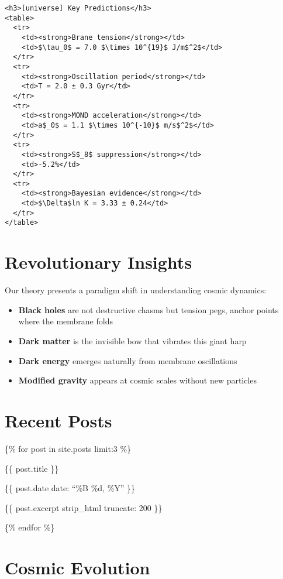 \documentclass[
  11pt,
]{report}
\providecommand{\tightlist}{%
  \setlength{\itemsep}{0pt}\setlength{\parskip}{0pt}}
\begin{document}
\begin{verbatim}
<h3>[universe] Key Predictions</h3>
<table>
  <tr>
    <td><strong>Brane tension</strong></td>
    <td>$\tau_0$ = 7.0 $\times 10^{19}$ J/m$^2$</td>
  </tr>
  <tr>
    <td><strong>Oscillation period</strong></td>
    <td>T = 2.0 ± 0.3 Gyr</td>
  </tr>
  <tr>
    <td><strong>MOND acceleration</strong></td>
    <td>a$_0$ = 1.1 $\times 10^{-10}$ m/s$^2$</td>
  </tr>
  <tr>
    <td><strong>S$_8$ suppression</strong></td>
    <td>-5.2%</td>
  </tr>
  <tr>
    <td><strong>Bayesian evidence</strong></td>
    <td>$\Delta$ln K = 3.33 ± 0.24</td>
  </tr>
</table>
\end{verbatim}

\section{Revolutionary Insights}\label{revolutionary-insights}

Our theory presents a paradigm shift in understanding cosmic dynamics:

\begin{itemize}
\tightlist
\item
  \textbf{Black holes} are not destructive chasms but tension pegs,
  anchor points where the membrane folds
\item
  \textbf{Dark matter} is the invisible bow that vibrates this giant
  harp
\item
  \textbf{Dark energy} emerges naturally from membrane oscillations
\item
  \textbf{Modified gravity} appears at cosmic scales without new
  particles
\end{itemize}

\section{Recent Posts}\label{recent-posts}

\{\% for post in site.posts limit:3 \%\}

\{\{ post.title \}\}

\{\{ post.date \textbar{} date: ``\%B \%d, \%Y'' \}\}

\{\{ post.excerpt \textbar{} strip\_html \textbar{} truncate: 200 \}\}

\{\% endfor \%\}

\section{Cosmic Evolution}\label{cosmic-evolution}
\end{document}
